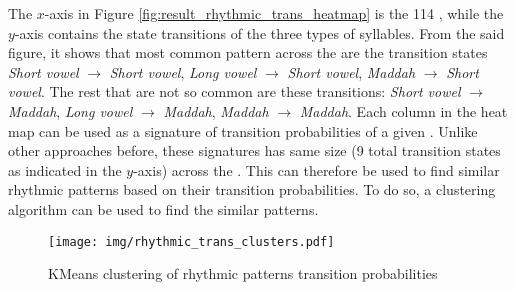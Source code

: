 The $x$-axis in Figure \ref{fig:result_rhythmic_trans_heatmap} is the 114  , while the $y$-axis contains the state transitions of the three types of syllables. From the said figure, it shows that most common pattern across the   are the transition states \textit{Short vowel} $\rightarrow$ \textit{Short vowel}, \textit{Long vowel} $\rightarrow$ \textit{Short vowel}, \textit{Maddah} $\rightarrow$ \textit{Short vowel}. The rest that are not so common are these transitions: \textit{Short vowel} $\rightarrow$ \textit{Maddah}, \textit{Long vowel} $\rightarrow$ \textit{Maddah}, \textit{Maddah} $\rightarrow$ \textit{Maddah}. Each column in the heat map can be used as a signature of transition probabilities of a given  . Unlike other approaches before, these signatures has same size (9 total transition states as indicated in the $y$-axis) across the  . This can therefore be used to find similar rhythmic patterns based on their transition probabilities. To do so, a clustering algorithm can be used to find the similar patterns.

\begin{figure}[!t]
    \centering
    \texttt{[image: img/rhythmic\_trans\_clusters.pdf]}
    \caption{KMeans clustering of rhythmic patterns transition probabilities}
    \label{fig:result_rhythmic_trans_heatmap_clusters}
\end{figure}

